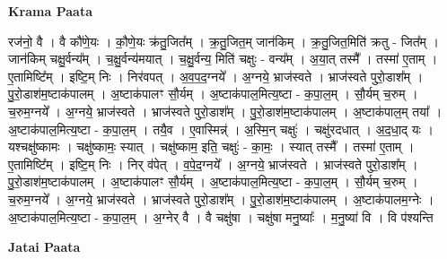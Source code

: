 \documentclass[17pt]{extarticle}
\begin{document}
\textbf{Krama Paata} \newline

रज॑नो॒ वै । वै कौ॑णे॒यः । कौ॒णे॒यः क्र॑तु॒जित᳚म् । क्र॒तु॒जित॒म् जान॑किम् । क्र॒तु॒जित॒मिति॑ क्रतु - जित᳚म् । जान॑किम् चक्षु॒र्वन्य᳚म् । च॒क्षु॒र्वन्य॑मयात् । च॒क्षु॒र्वन्य॒ मिति॑ चक्षुः - वन्य᳚म् । अ॒या॒त् तस्मै᳚ । तस्मा॑ ए॒ताम् । ए॒तामिष्टि᳚म् । इष्टि॒म् निः । निर॑वपत् । अ॒व॒प॒द॒ग्नये᳚ । अ॒ग्नये॒ भ्राज॑स्वते । भ्राज॑स्वते पुरो॒डाश᳚म् । पु॒रो॒डाश॑म॒ष्टाक॑पालम् । अ॒ष्टाक॑पालꣳ सौ॒र्यम् । अ॒ष्टाक॑पाल॒मित्य॒ष्टा - क॒पा॒ल॒म् । सौ॒र्यम् च॒रुम् । च॒रुम॒ग्नये᳚ । अ॒ग्नये॒ भ्राज॑स्वते । भ्राज॑स्वते पुरो॒डाश᳚म् । पु॒रो॒डाश॑म॒ष्टाक॑पालम् । अ॒ष्टाक॑पाल॒म् तया᳚ । अ॒ष्टाक॑पाल॒मित्य॒ष्टा - क॒पा॒ल॒म् । तयै॒व । ए॒वास्मिन्न्॑ । अ॒स्मि॒न् चक्षुः॑ । चक्षु॑रदधात् । अ॒द॒धा॒द् यः । यश्चक्षु॑ष्कामः । चक्षु॑ष्कामः॒ स्यात् । चक्षु॑ष्काम॒ इति॒ चक्षुः॑ - का॒मः॒ । स्यात् तस्मै᳚ । तस्मा॑ ए॒ताम् । ए॒तामिष्टि᳚म् । इष्टि॒म् निः । निर् व॑पेत् । व॒पे॒द॒ग्नये᳚ । अ॒ग्नये॒ भ्राज॑स्वते । भ्राज॑स्वते पुरो॒डाश᳚म् । पु॒रो॒डाश॑म॒ष्टाक॑पालम् । अ॒ष्टाक॑पालꣳ सौ॒र्यम् । अ॒ष्टाक॑पाल॒मित्य॒ष्टा - क॒पा॒ल॒म् । सौ॒र्यम् च॒रुम् । च॒रुम॒ग्नये᳚ । अ॒ग्नये॒ भ्राज॑स्वते । भ्राज॑स्वते पुरो॒डाश᳚म् । पु॒रो॒डाश॑म॒ष्टाक॑पालम् । अ॒ष्टाक॑पालम॒ग्नेः । अ॒ष्टाक॑पाल॒मित्य॒ष्टा - क॒पा॒ल॒म् । अ॒ग्नेर् वै । वै चक्षु॑षा । चक्षु॑षा मनु॒ष्याः᳚ । म॒नु॒ष्या॑ वि । वि प॑श्यन्ति \newline

\textbf{Jatai Paata} \newline
\end{document}
